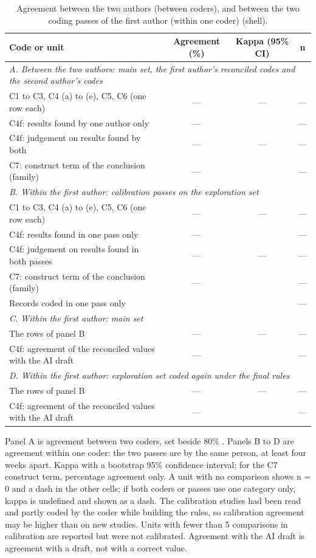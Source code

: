 \begin{table}[!htbp]
\centering
\caption{Agreement between the two authors (between coders), and between the two coding passes of the first author
(within one coder) (shell).}
\footnotesize
\begin{tabularx}{\linewidth}{Xccc}
\toprule
Code or unit & Agreement (\%) & Kappa (95\% CI) & n \\
\midrule
\multicolumn{4}{l}{\emph{A. Between the two authors: main set, the first author's reconciled codes and the second author's codes}} \\
C1 to C3, C4 (a) to (e), C5, C6 (one row each) & --- & --- & --- \\
C4f: results found by one author only & --- & & --- \\
C4f: judgement on results found by both & --- & --- & --- \\
C7: construct term of the conclusion (family) & --- & & --- \\
\multicolumn{4}{l}{\emph{B. Within the first author: calibration passes on the exploration set}} \\
C1 to C3, C4 (a) to (e), C5, C6 (one row each) & --- & --- & --- \\
C4f: results found in one pass only & --- & & --- \\
C4f: judgement on results found in both passes & --- & --- & --- \\
C7: construct term of the conclusion (family) & --- & & --- \\
Records coded in one pass only & & & --- \\
\multicolumn{4}{l}{\emph{C. Within the first author: main set}} \\
The rows of panel B & --- & --- & --- \\
C4f: agreement of the reconciled values with the AI draft & --- & & --- \\
\multicolumn{4}{l}{\emph{D. Within the first author: exploration set coded again under the final rules}} \\
The rows of panel B & --- & --- & --- \\
C4f: agreement of the reconciled values with the AI draft & --- & & --- \\
\bottomrule
\end{tabularx}

\smallskip
\raggedright\footnotesize Panel A is agreement between two coders, set beside 80\% \citep{shea2017}. Panels B to D are
agreement within one coder: the two passes are by the same person, at least four weeks apart. Kappa with a bootstrap
95\% confidence interval; for the C7 construct term, percentage agreement only. A unit with no comparison shows n = 0
and a dash in the other cells; if both coders or passes use one category only, kappa is undefined and shown as a
dash. The calibration studies had been read and partly coded by the coder while building the rules, so calibration
agreement may be higher than on new studies. Units with fewer than 5 comparisons in calibration are reported but were
not calibrated. Agreement with the AI draft is agreement with a draft, not with a correct value.
\end{table}

